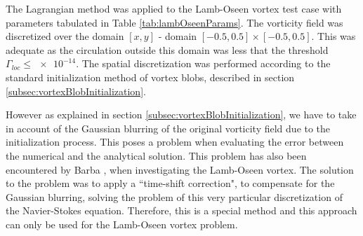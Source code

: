 	

The Lagrangian method was applied to the Lamb-Oseen vortex test case with parameters tabulated in Table \ref{tab:lambOseenParams}. The vorticity field was discretized over the domain $[x,y]$ - domain $\left[-0.5,0.5\right]\times\left[-0.5,0.5\right]$. This was adequate as the circulation outside this domain was less that the threshold $\Gamma_{loc}\le\num{e-14}$. The spatial discretization was performed according to the standard initialization method of vortex blobs, described in section \ref{subsec:vortexBlobInitialization}.

However as explained in section \ref{subsec:vortexBlobInitialization}, we have to take in account of the Gaussian blurring of the original vorticity field due to the initialization process. This poses a problem when evaluating the error between the numerical and the analytical solution. This problem has also been encountered by Barba \cite{Barba2004c}, when investigating the Lamb-Oseen vortex. The solution to the problem was to apply a ``time-shift correction", to compensate for the Gaussian blurring, solving the problem of this very particular discretization of the Navier-Stokes equation. Therefore, this is a special method and this approach can only be used for the Lamb-Oseen vortex problem.

